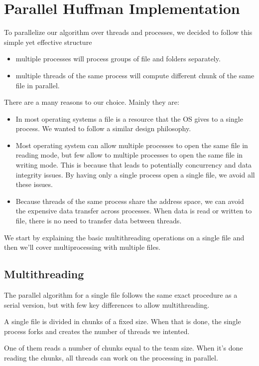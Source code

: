 \section{Parallel Huffman Implementation}
To parallelize our algorithm over threads and processes, we decided to follow this simple yet effective structure
\begin{itemize}
    \item multiple processes will process groups of file and folders separately.
    \item multiple threads of the same process will compute different chunk of the same file in parallel.
\end{itemize}

There are a many reasons to our choice. Mainly they are:

\begin{itemize}
	\item In most operating systems a file is a resource that the OS gives to a single process. We wanted to follow a similar design philosophy.
	\item Most operating system can allow multiple processes to open the same file in reading mode, but few allow to multiple processes to open the same file in writing mode. This is because that leads to potentially concurrency and data integrity issues. By having only a single process open a single file, we avoid all these issues.
	\item Because threads of the same process share the address space, we can avoid the expensive data transfer across processes. When data is read or written to file, there is no need to transfer data between threads.
\end{itemize}

We start by explaining the basic multithreading operations on a single file and then we'll cover multiprocessing with multiple files.

\subsection{Multithreading}

The parallel algorithm for a single file follows the same exact procedure as a serial version, but with few key differences to allow multithreading.

A single file is divided in chunks of a fixed size. When that is done, the single process forks and creates the number of threads we intented.

One of them reads a number of chunks equal to the team size. When it's done reading the chunks, all threads can work on the processing in parallel. 

